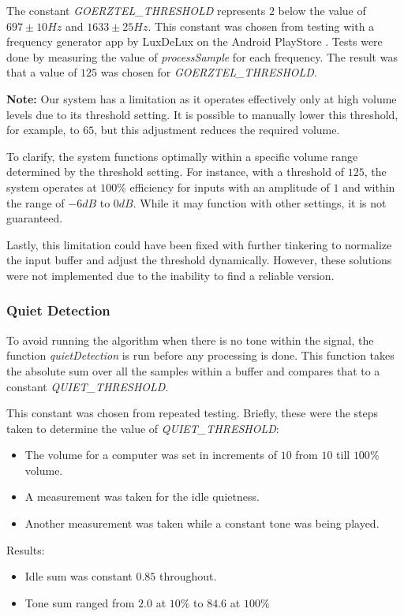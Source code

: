 \documentclass{cce2014-design}
\begin{document}
The constant \textit{GOERZTEL\_THRESHOLD} represents $2$ below the value of $697\pm10Hz$ and $1633\pm25Hz$. This constant was chosen from testing with a frequency generator app by LuxDeLux on the Android PlayStore \cite{FrequencyGeneratorApp}. Tests were done by measuring the value of \textit{processSample} for each frequency. The result was that a value of $125$ was chosen for \textit{GOERZTEL\_THRESHOLD}.

\textbf{Note:} Our system has a limitation as it operates effectively only at high volume levels due to its threshold setting.
It is possible to manually lower this threshold, for example, to $65$, but this adjustment reduces the required volume.

To clarify, the system functions optimally within a specific volume range determined by the threshold setting.
For instance, with a threshold of $125$, the system operates at $100\%$ efficiency for inputs with an amplitude of $1$ and within the range of $-6dB$ to $0dB$. While it may function with other settings, it is not guaranteed.

Lastly, this limitation could have been fixed with further tinkering to normalize the input buffer and adjust the threshold dynamically.
However, these solutions were not implemented due to the inability to find a reliable version.

\subsubsection{Quiet Detection}

To avoid running the algorithm when there is no tone within the signal,
the function \textit{quietDetection} is run before any processing is done.
This function takes the absolute sum over all the samples within a buffer and compares that to a constant \textit{QUIET\_THRESHOLD}.

This constant was chosen from repeated testing. Briefly, these were the steps taken to determine the value of \textit{QUIET\_THRESHOLD}:
\begin{itemize}
   \item The volume for a computer was set in increments of $10$ from $10$ till $100\%$ volume.
   \item A measurement was taken for the idle quietness.
   \item Another measurement was taken while a constant tone was being played.
\end{itemize}

Results:
\begin{itemize}
   \item Idle sum was constant $0.85$ throughout.
   \item Tone sum ranged from $2.0$ at $10\%$ to $84.6$ at $100\%$
\end{itemize}
\end{document}
